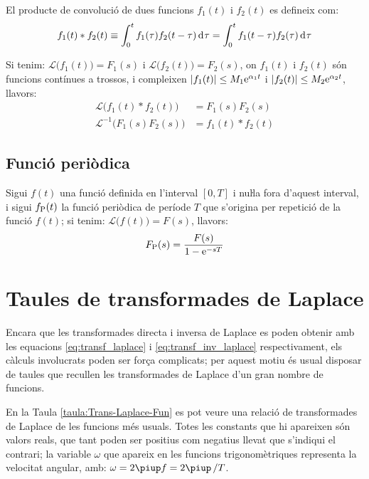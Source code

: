 El producte de convolució de dues funcions $f_1(t)$ i $f_2(t)$ es
defineix com:
\begin{equation}
    f_1(t) * f_2(t) \equiv \int_0^t f_1(\tau) f_2(t-\tau) \diff\tau =
    \int_0^t f_1(t-\tau) f_2(\tau) \diff\tau
\end{equation}

Si tenim: $\mathcal{L} \bigl(f_1(t) \bigr) = F_1(s)$ i $\mathcal{L}
\bigl(f_2(t) \bigr) = F_2(s)$, on $f_1(t)$ i $f_2(t)$ són funcions
contínues a trossos, i compleixen $|f_1(t)|\leq M_1\mathrm{e}^{\alpha_1 t}$
i $|f_2(t)|\leq M_2\mathrm{e}^{\alpha_2 t}$, llavors:
\begin{align}
    \mathcal{L} \bigl( f_1(t) * f_2(t) \bigr) &= F_1(s) F_2(s)\\
    \mathcal{L}^{-1} \bigl( F_1(s) F_2(s) \bigr) &= f_1(t) * f_2(t)
\end{align}

\subsection{Funció periòdica}

Sigui $f(t)$ una funció definida en l'interval $[0,T]$ i nuŀla
fora d'aquest interval, i sigui $f_\mathrm{P}(t)$ la funció periòdica de
període $T$ que s'origina per repetició de la funció $f(t)$; si
tenim: $\mathcal{L} \bigl(f(t) \bigr) = F(s)$, llavors:
\begin{equation}
    F_\mathrm{P}(s) = \frac{F(s)}{1-\mathrm{e}^{-sT}}
\end{equation}

\section{Taules de transformades de Laplace}

Encara que les transformades directa i inversa de Laplace es poden
obtenir amb les equacions \eqref{eq:transf_laplace} i
\eqref{eq:transf_inv_laplace} respectivament, els càlculs
involucrats poden ser força complicats; per aquest motiu és usual
disposar de taules que recullen les transformades de Laplace d'un
gran nombre de funcions.

En la Taula \vref{taula:Trans-Laplace-Fun} es pot veure una relació de
transformades de Laplace de les funcions més usuals. Totes les
constants que hi apareixen són valors reals, que tant poden ser
positius com negatius llevat que s'indiqui el contrari; la variable
$\omega$ que apareix en les funcions trigonomètriques representa la
velocitat angular, amb: $\omega=2\piup f=2\piup\,/T$.

